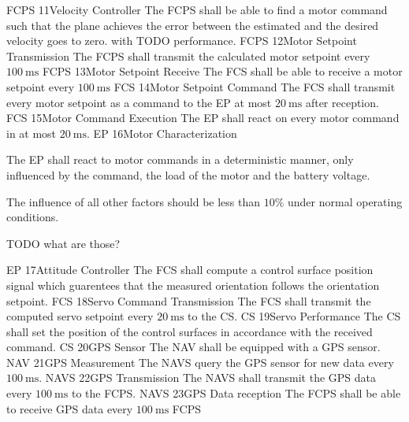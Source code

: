     {}
    {FCPS}
\req
    {11}{Velocity Controller}
    {
        The FCPS shall be able to find a motor command such
        that the plane achieves the error between the estimated
        and the desired velocity goes to zero.
        with TODO performance.
    }
    {}
    {FCPS}
\req
    {12}{Motor Setpoint Transmission}
    {
        The FCPS shall transmit the calculated motor setpoint
        every $\SI{100}{\milli\second}$
    }
    {}
    {FCPS}
\req
    {13}{Motor Setpoint Receive}
    {
        The FCS shall be able to receive a motor setpoint
        every $\SI{100}{\milli\second}$
    }
    {}
    {FCS}
\req
    {14}{Motor Setpoint Command}
    {
        The FCS shall transmit every motor setpoint
        as a command to the EP at most $\SI{20}{\milli\second}$
        after reception. 
    }
    {}
    {FCS}
\req
    {15}{Motor Command Execution}
    {
        The EP shall react on every motor command in at most
        $\SI{20}{\milli\second}$.
    }
    {}
    {EP}
\req
    {16}{Motor Characterization}
    {
        The EP shall react to motor commands in a deterministic
        manner, only influenced by the command, the load of the
        motor and the battery voltage.
        
        The influence of all other factors should be less
        than $10\%$ under normal operating conditions.

        TODO what are those?
    }
    {}
    {EP}
\req
    {17}{Attitude Controller}
    {
        The FCS shall compute a control surface position signal 
        which guarentees that the measured orientation follows
        the orientation setpoint.
    }
    {}
    {FCS}
\req
    {18}{Servo Command Transmission}
    {
        The FCS shall transmit the computed servo setpoint every
        $\SI{20}{\milli\second}$ to the CS.
    }
    {}
    {CS}
\req
    {19}{Servo Performance}
    {
        The CS shall set the position of the control surfaces
        in accordance with the received command.
    }
    {}
    {CS}
\req
    {20}{GPS Sensor}
    {
        The NAV shall be equipped with a GPS sensor.
    }
    {}
    {NAV}
\req
    {21}{GPS Measurement}
    {
        The NAVS query the GPS sensor for new data every $\SI{100}{\milli\second}$.
    }
    {}
    {NAVS}
\req
    {22}{GPS Transmission}
    {
        The NAVS shall transmit the GPS data every $\SI{100}{\milli\second}$
        to the FCPS.
    }
    {}
    {NAVS}
\req
    {23}{GPS Data reception}
    {
        The FCPS shall be able to receive GPS data every $\SI{100}{\milli\second}$
    }
    {}
    {FCPS}
